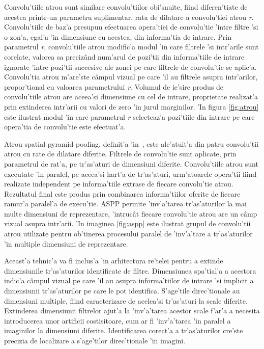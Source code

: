 \documentclass[12pt,a4paper,twoside]{report}
\begin{document}
Convolu'tiile atrou sunt similare convolu'tiilor obi'snuite, fiind diferen'tiate de acestea printr-un parametru suplimentar, rata de dilatare a convolu'tiei atrou \textit{r}. Convolu'tiile de baz'a presupun efectuarea opera'tiei de convolu'tie 'intre filtre 'si o zon'a, egal'a 'in dimensiune cu acestea, din informa'tia de intrare. Prin parametrul \textit{r}, convolu'tiile atrou modific'a modul 'in care filtrele 'si intr'arile sunt corelate, valorea sa preciz\^and num'arul de pozi'tii din informa'tiile de intrare ignorate 'intre pozi'tii succesive ale zonei pe care filtrele de convolu'tie se aplic'a. Convolu'tia atrou m'are'ste c\^ampul vizual pe care 'il au filtrele asupra intr'arilor, propor'tional cu valoarea parametrului \textit{r}. Volumul de ie'sire produs de convolu'tiile atrou are aceea'si dimensiune cu cel de intrare, proprietate realizat'a prin extinderea intr'arii cu valori de zero 'in jurul marginilor.
'In figura \ref{fig:atrou} este ilustrat modul 'in care parametrul \textit{r} selecteaz'a pozi'tiile din intrare pe care opera'tia de convolu'tie este efectuat'a. 

Atrou spatial pyramid pooling, definit'a 'in~\cite{ASPP}, este alc'atuit'a din patru convolu'tii atrou cu rate de dilatare diferite. Filtrele de convolu'tie sunt aplicate, prin parametrul de rat'a, pe tr'as'aturi de dimensiuni diferite. Convolu'tiile atrou sunt executate 'in paralel, pe aceea'si hart'a de tr'as'aturi, urm'atoarele opera'tii fiind realizate independent pe informa'tiile extrase de fiecare convolu'tie atrou. Rezultatul final este produs prin combinarea informa'tiilor oferite de fiecare ramur'a paralel'a de execu'tie. ASPP permite 'inv'a'tarea tr'as'aturilor la mai multe dimensiuni de reprezentare, 'intruc\^at fiecare convolu'tie atrou are un c\^amp vizual asupra intr'arii. 'In imaginea \ref{fig:aspp} este ilustrat grupul de convolu'tii atrou utilizate pentru ob'tinerea procesului paralel de 'inv'a'tare a tr'as'aturilor 'in multiple dimensiuni de reprezentare.

Aceast'a tehnic'a va fi inclus'a 'in arhitectura re'telei pentru a extinde dimensiunile tr'as'aturilor identificate de filtre. Dimensiunea spa'tial'a a acestora indic'a c\^ampul vizual pe care 'il au asupra informa'tiilor de intrare 'si implicit a dimensiunii tr'as'aturilor pe care le pot identifica. S'age'tile direc'tionale au dimensiuni multiple, fiind caracterizare de acelea'si tr'as'aturi la scale diferite. Extinderea dimensiunii filtrelor ajut'a la 'inv'a'tarea acestor scale f'ar'a a necesita introducerea unor artificii costisitoare, cum ar fi 'inv'a'tarea 'in paralel a imaginilor la dimensiuni diferite. Identificarea corect'a a tr'as'aturilor cre'ste precizia de localizare a s'age'tilor direc'tionale 'in imagini.
\end{document}
